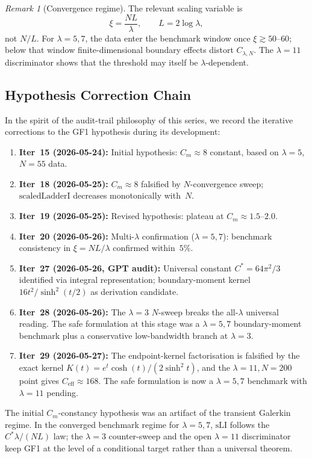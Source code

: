 \documentclass[12pt,a4paper]{article}
\theoremstyle{definition}
\theoremstyle{remark}
\newtheorem{remark}[theorem]{Remark}
\begin{document}
\begin{remark}[Convergence regime]
\label{rem:NL-regime}
The relevant scaling variable is
\[
  \xi=\frac{NL}{\lambda},\qquad L=2\log\lambda,
\]
not $N/L$. For $\lambda=5,7$, the data enter the benchmark window once
$\xi\gtrsim50$--$60$; below that window finite-dimensional boundary
effects distort $C_{\lambda,N}$. The $\lambda=11$ discriminator shows that
the threshold may itself be $\lambda$-dependent.
\end{remark}

\subsection{Hypothesis Correction Chain}
\label{sec:gf1-corrections}

In the spirit of the audit-trail philosophy of this series, we record the iterative corrections to the GF1 hypothesis during its development:
\begin{enumerate}
  \item \textbf{Iter~15 (2026-05-24):} Initial hypothesis: $C_m \approx 8$ constant, based on $\lambda = 5$, $N = 55$ data.
  \item \textbf{Iter~18 (2026-05-25):} $C_m \approx 8$ falsified by $N$-convergence sweep; $\mathrm{scaledLadderI}$ decreases monotonically with~$N$.
  \item \textbf{Iter~19 (2026-05-25):} Revised hypothesis: plateau at $C_m \approx 1.5$--$2.0$.
  \item \textbf{Iter~20 (2026-05-26):} Multi-$\lambda$ confirmation ($\lambda = 5, 7$): benchmark consistency in $\xi=NL/\lambda$ confirmed within~$5\%$.
  \item \textbf{Iter~27 (2026-05-26, GPT audit):} Universal constant $C^* = 64\pi^2/3$ identified via integral representation; boundary-moment kernel $16t^2/\sinh^2(t/2)$ as derivation candidate.
  \item \textbf{Iter~28 (2026-05-26):} The $\lambda=3$ $N$-sweep breaks the all-$\lambda$ universal reading. The safe formulation at this stage was a $\lambda=5,7$ boundary-moment benchmark plus a conservative low-bandwidth branch at $\lambda=3$.
  \item \textbf{Iter~29 (2026-05-27):} The endpoint-kernel factorisation is falsified by the exact kernel $K(t)=e^t\cosh(t)/(2\sinh^2t)$, and the $\lambda=11,N=200$ point gives $C_{\mathrm{eff}}\approx168$. The safe formulation is now a $\lambda=5,7$ benchmark with $\lambda=11$ pending.
\end{enumerate}
The initial $C_m$-constancy hypothesis was an artifact of the transient
Galerkin regime. In the converged benchmark regime for $\lambda=5,7$,
$\mathrm{sLI}$ follows the $C^*\lambda/(NL)$ law; the $\lambda=3$
counter-sweep and the open $\lambda=11$ discriminator keep GF1 at the
level of a conditional target rather than a universal theorem.
\end{document}
